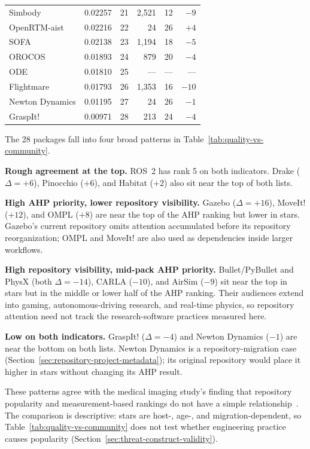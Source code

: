 \begin{table}[p]
\begin{tabular}{@{}P{2.5cm}rcrrr@{}}
Simbody         & 0.02257 & 21 & 2,521  & 12 & $-9$  \\
OpenRTM-aist    & 0.02216 & 22 & 24     & 26 & $+4$  \\
SOFA            & 0.02138 & 23 & 1,194  & 18 & $-5$  \\
OROCOS          & 0.01893 & 24 & 879    & 20 & $-4$  \\
ODE             & 0.01810 & 25 & ---    & ---& ---   \\
Flightmare      & 0.01793 & 26 & 1,353  & 16 & $-10$ \\
Newton Dynamics& 0.01195 & 27 & 24     & 26 & $-1$  \\
GraspIt!        & 0.00971 & 28 & 213    & 24 & $-4$  \\
\bottomrule
\end{tabular}
\end{table}

The 28 packages fall into four broad patterns in Table~\ref{tab:quality-vs-community}.

\textbf{Rough agreement at the top.} ROS~2 has rank 5 on both indicators. Drake ($\Delta=+6$), Pinocchio ($+6$), and Habitat ($+2$) also sit near the top of both lists.

\textbf{High AHP priority, lower repository visibility.} Gazebo ($\Delta=+16$), MoveIt! ($+12$), and OMPL ($+8$) are near the top of the AHP ranking but lower in stars. Gazebo's current repository omits attention accumulated before its repository reorganization; OMPL and MoveIt! are also used as dependencies inside larger workflows.

\textbf{High repository visibility, mid-pack AHP priority.} Bullet/PyBullet and PhysX (both $\Delta=-14$), CARLA ($-10$), and AirSim ($-9$) sit near the top in stars but in the middle or lower half of the AHP ranking. Their audiences extend into gaming, autonomous-driving research, and real-time physics, so repository attention need not track the research-software practices measured here.

\textbf{Low on both indicators.} GraspIt! ($\Delta=-4$) and Newton Dynamics ($-1$) are near the bottom on both lists. Newton Dynamics is a repository-migration case (Section~\ref{sec:repository-project-metadata}); its original repository would place it higher in stars without changing its AHP result.

These patterns agree with the medical imaging study's finding that repository popularity and measurement-based rankings do not have a simple relationship~\citep{Smith2024MI}. The comparison is descriptive: stars are host-, age-, and migration-dependent, so Table~\ref{tab:quality-vs-community} does not test whether engineering practice causes popularity (Section~\ref{sec:threat-construct-validity}).
